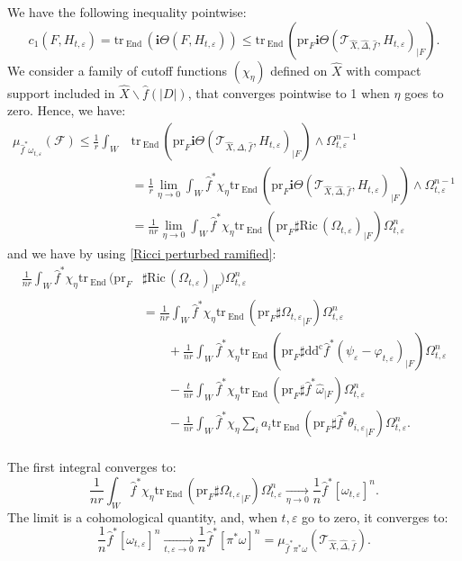 \documentclass[12pt,a4paper]{amsart}
\newcommand{\End}{\mathrm{End}\,}
\newcommand{\ddc}{\mathrm{dd^c}}
\newcommand{\Ric}{\mathrm{Ric}\,}
\newcommand{\tr}{\mathrm{tr}\,}
\theoremstyle{plain}
\theoremstyle{definition}
\begin{document}
We have the following inequality pointwise:
$$
    c_1(F, H_{t, \varepsilon}) = \tr_\End(\textbf{i}\Theta(F, H_{t, \varepsilon})) \leq \tr_\End(\mathrm{pr}_F \textbf{i}\Theta(\mathcal{T}_{\widehat{X}, \widehat{\Delta}, \widehat{f}}, H_{t, \varepsilon})_{|F}).
$$
We consider a family of cutoff functions $(\chi_\eta)$ defined on $\widehat{X}$ with compact support included in $\widehat{X} \backslash \widehat{f}(|D|)$, that converges pointwise to 1 when $\eta$ goes to zero. Hence, we have:
\begin{align*}
\mu_{\widehat{f}^*\omega_{t, \varepsilon}}(\mathcal{F}) \leq \frac{1}{r}\int_{W} & \tr_\End(\mathrm{pr}_F \textbf{i}\Theta (\mathcal{T}_{\widehat{X}, \widehat{\Delta}, \widehat{f}}, H_{t, \varepsilon})_{|F}) \wedge \Omega_{t, \varepsilon}^{n-1} \\
& = \frac{1}{r} \lim_{\eta \to 0} \int_{W} \widehat{f}^*\chi_\eta \tr_\End(\mathrm{pr}_F \textbf{i}\Theta(\mathcal{T}_{\widehat{X}, \widehat{\Delta}, \widehat{f}}, H_{t, \varepsilon})_{|F}) \wedge \Omega_{t, \varepsilon}^{n-1} \\
& = \frac{1}{nr} \lim_{\eta \to 0} \int_{W} \widehat{f}^*\chi_\eta \tr_\End(\mathrm{pr}_F \sharp \Ric(\Omega_{t, \varepsilon})_{|F}) \Omega_{t, \varepsilon}^{n}
\end{align*}
and we have by using \eqref{Ricci perturbed ramified}:
\begin{align*}
\frac{1}{nr}\int_{W} \widehat{f}^*\chi_\eta \tr_\End(\mathrm{pr}_F & \sharp \Ric(\Omega_{t, \varepsilon})_{|F}) \Omega_{t, \varepsilon}^{n} \\
& = \frac{1}{nr} \int_{W} \widehat{f}^*\chi_\eta \tr_\End(\mathrm{pr}_F {\sharp \Omega_{t, \varepsilon}}_{|F}) \Omega_{t, \varepsilon}^{n} \\
& \qquad + \frac{1}{nr} \int_{W} \widehat{f}^*\chi_\eta \tr_\End(\mathrm{pr}_F \sharp \ddc \widehat{f}^*(\psi_\varepsilon - \varphi_{t, \varepsilon})_{|F}) \Omega_{t, \varepsilon}^{n} \\
& \qquad - \frac{t}{nr} \int_{W} \widehat{f}^*\chi_\eta \tr_\End(\mathrm{pr}_F \sharp \widehat{f}^*\widehat{\omega}_{|F} ) \Omega_{t, \varepsilon}^{n} \\
& \qquad - \frac{1}{nr} \int_{W} \widehat{f}^*\chi_\eta \sum_i a_i \tr_\End(\mathrm{pr}_F {\sharp \widehat{f}^*\theta_{i, \varepsilon}}_{|F}) \Omega_{t, \varepsilon}^{n}. \\
\end{align*}

The first integral converges to:
$$
\frac{1}{nr}\int_{W} \widehat{f}^*\chi_\eta \tr_\End(\mathrm{pr}_F {\sharp \Omega_{t, \varepsilon}}_{|F}) \Omega_{t, \varepsilon}^{n}  \underset{\eta \to 0}{\longrightarrow} \frac{1}{n} \widehat{f}^* \left[ \omega_{t, \varepsilon} \right]^n.
$$
The limit is a cohomological quantity, and, when $t, \varepsilon$ go to zero, it converges to: 
$$
\frac{1}{n}\widehat{f}^* \left[ \omega_{t, \varepsilon} \right]^n \underset{t, \varepsilon \to 0}{\longrightarrow} \frac{1}{n}\widehat{f}^* \left[ \pi^*\omega \right]^n = \mu_{\widehat{f}^*\pi^*\omega}(\mathcal{T}_{\widehat{X}, \widehat{\Delta}, \widehat{f}}).
$$
\end{document}
